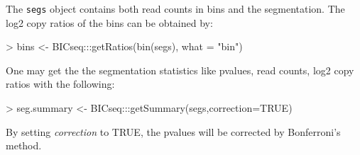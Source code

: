 \documentclass[12pt]{article}
\newcommand{\Robject}[1]{{\texttt{#1}}}
\begin{document}
The \Robject{segs} object contains both read counts in bins and the 
segmentation. The log2 copy ratios of the bins can be obtained by:

\begin{Schunk}
\begin{Sinput}
> bins <- BICseq:::getRatios(bin(segs), what = "bin")
\end{Sinput}
\end{Schunk}

One may get the the segmentation statistics like pvalues, read counts, log2 copy ratios with the following:

\begin{Schunk}
\begin{Sinput}
> seg.summary <- BICseq:::getSummary(segs,correction=TRUE)
\end{Sinput}
\end{Schunk}
By setting \textit{correction} to TRUE, the pvalues will be corrected by Bonferroni's method.
\end{document}
